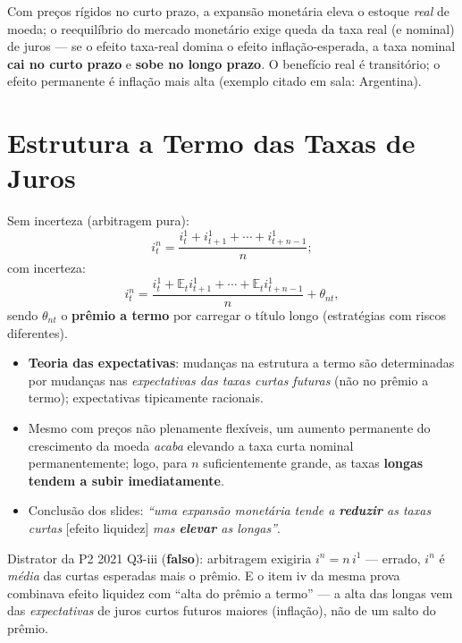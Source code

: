 \documentclass[12pt, a4paper]{article}
\newcommand{\E}{\mathbb{E}}
\begin{document}
Com preços rígidos no curto prazo, a expansão monetária eleva o estoque
\emph{real} de moeda; o reequilíbrio do mercado monetário exige queda da taxa
real (e nominal) de juros --- se o efeito taxa-real domina o efeito
inflação-esperada, a taxa nominal \textbf{cai no curto prazo} e \textbf{sobe no
longo prazo}. O benefício real é transitório; o efeito permanente é inflação
mais alta (exemplo citado em sala: Argentina).

\section{Estrutura a Termo das Taxas de Juros}

\begin{formulabox}[title={Sem e com incerteza (slides, eqs.\ 5--6)}]
Sem incerteza (arbitragem pura):
\[
i_t^n = \frac{i_t^1 + i_{t+1}^1 + \cdots + i_{t+n-1}^1}{n};
\]
com incerteza:
\[
i_t^n = \frac{i_t^1 + \E_t i_{t+1}^1 + \cdots + \E_t i_{t+n-1}^1}{n}
        + \theta_{nt},
\]
sendo $\theta_{nt}$ o \textbf{prêmio a termo} por carregar o título longo
(estratégias com riscos diferentes).
\end{formulabox}

\begin{itemize}[leftmargin=1.4em]
\item \textbf{Teoria das expectativas}: mudanças na estrutura a termo são
determinadas por mudanças nas \emph{expectativas das taxas curtas futuras}
(não no prêmio a termo); expectativas tipicamente racionais.
\item Mesmo com preços não plenamente flexíveis, um aumento permanente do
crescimento da moeda \emph{acaba} elevando a taxa curta nominal
permanentemente; logo, para $n$ suficientemente grande, as taxas
\textbf{longas tendem a subir imediatamente}.
\item Conclusão dos slides: \emph{``uma expansão monetária tende a
\textbf{reduzir} as taxas curtas} [efeito liquidez] \emph{mas \textbf{elevar}
as longas''}.
\end{itemize}

\begin{provabox}[title={Como cai na prova}]
Distrator da P2 2021 Q3-iii (\textbf{falso}): arbitragem exigiria
$i^n = n\,i^1$ --- errado, $i^n$ é \emph{média} das curtas esperadas mais o
prêmio. E o item iv da mesma prova combinava efeito liquidez com ``alta do
prêmio a termo'' --- a alta das longas vem das \emph{expectativas} de juros
curtos futuros maiores (inflação), não de um salto do prêmio.
\end{provabox}
\end{document}
